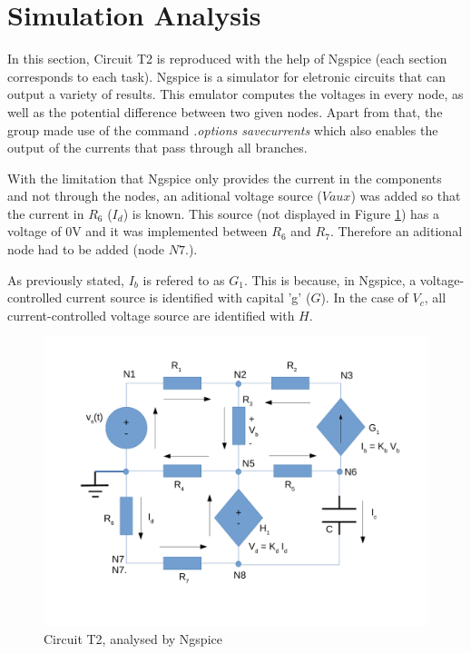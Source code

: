 \section{Simulation Analysis}
\label{sec:simulation}


In this section, Circuit T2 is reproduced with the help of Ngspice (each section corresponds
to each task). Ngspice is a simulator for eletronic circuits that can output a variety of results.
This emulator computes the voltages in every node, as well as the potential difference
between two given nodes. Apart from that, the group made use of the command
{\em .options savecurrents} which also enables the output of the currents that pass
through all branches.

With the limitation that Ngspice only provides the current in the components and not through
the nodes, an aditional voltage source ($Vaux$) was added so that the current in $R_6$ ($I_d$)
is known. This source (not displayed in Figure \ref{fig:Dsnh_sim_t2}) has a voltage of 0V and it 
was implemented between $R_6$ and $R_7$. Therefore an aditional node had to be added (node $N7.$).

As previously stated, $I_b$ is refered to as $G_1$. This is because, in Ngspice, a
voltage-controlled current source is identified with capital 'g' ($G$). In the case of
$V_c$, all current-controlled voltage source are identified with $H$.

\begin{figure}[ht]
	\centering
	\includegraphics[width=0.75\linewidth]{dsnh_sim_t2.pdf}
	\caption{Circuit T2, analysed by Ngspice}
\label{fig:Dsnh_sim_t2}
\end{figure}


